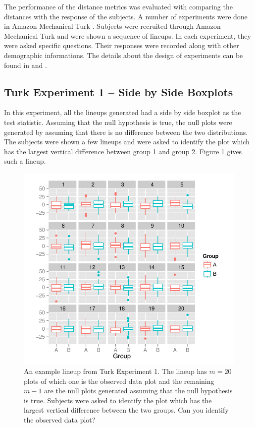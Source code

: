 \documentclass[12]{article}
\begin{document}

The performance of the distance metrics was evaluated with comparing the distances with the response of the subjects. A number of experiments were done in Amazon Mechanical Turk \citep{turk}. Subjects were recruited through Amazon Mechanical Turk \citep{turk} and were shown a sequence of lineups. In each experiment, they were asked specific questions. Their responses were recorded along with other demographic informations. The details about the design of experiments can be found in \cite{majumder:2011} and \cite{roychowdhury:2013}. 

\subsection{Turk Experiment 1 -- Side by Side Boxplots}

In this experiment, all the lineups generated had a side by side boxplot as the test statistic. Assuming that the null hypothesis is true, the null plots were generated by assuming that there is no difference between the two distributions. The subjects were shown a few lineups and were asked to identify the plot which has the largest vertical difference between group 1 and group 2. Figure \ref{turk1} gives such a lineup. \\

\begin{figure}[htbp]
\centering
\includegraphics[width=.95\textwidth]{turk1-example.pdf}
\caption{An example lineup from Turk Experiment 1. The lineup has $m = 20$ plots of which one is the observed data plot and the remaining $m - 1$ are the null plots generated assuming that the null hypothesis is true. Subjects were asked to identify the plot which has the largest vertical difference between the two groups. Can you identify the observed data plot?}
\label{turk1}
\end{figure}
\end{document}
